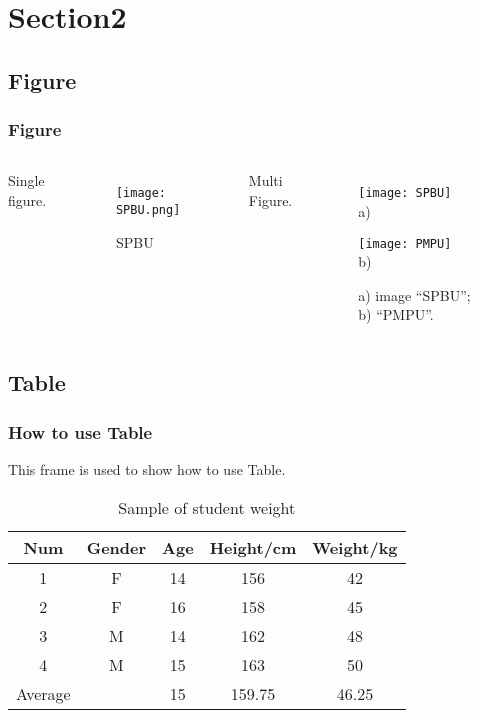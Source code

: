 \section{Section2}
\subsection{Figure}
\begin{frame}
    \frametitle{Figure}
    \begin{columns}
        Single figure.
        \begin{figure}[ht]
            \centering
              \texttt{[image: SPBU.png]}
              \caption{SPBU}
              \label{fig:SPBU}
        \end{figure}
        Multi Figure.
        \begin{figure}[ht]
            \centering
            \begin{minipage}[t]{0.48\linewidth}
            \centering
            \texttt{[image: SPBU]}\\
            a)
            \end{minipage} \hfill
            \begin{minipage}[t]{0.48\linewidth}
            \centering
            \texttt{[image: PMPU]}\\
            b)
            \end{minipage}
            \caption{a) image ``SPBU''; b) ``PMPU''.}
            \label{fig:APairPlaintext}
        \end{figure}
    \end{columns}
\end{frame}
\subsection{Table}
\begin{frame}
\frametitle{How to use Table}
    This frame is used to show how to use Table.
    \begin{table}[ht]
        \centering
        \caption{Sample of student weight}
        \label{tab:1}
            \begin{tabular}{ccccc}
            \toprule
            Num&Gender&Age&Height/cm&Weight/kg\\
            \midrule
            1&F&14&156&42\\
            2&F&16&158&45\\
            3&M&14&162&48\\
            4&M&15&163&50\\
            \cmidrule{3-5} %
            Average& &15&159.75&46.25\\
            \bottomrule
            \end{tabular}
        \end{table}
\end{frame}